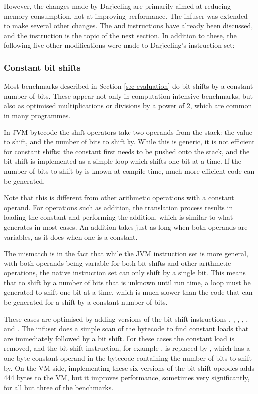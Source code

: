 However, the changes made by Darjeeling are primarily aimed at reducing memory consumption, not at improving performance. The infuser was extended to make several other changes. The  and  instructions have already been discussed, and the  instruction is the topic of the next section. In addition to these, the following five other modifications were made to Darjeeling's instruction set:

\subsubsection{Constant bit shifts}
\label{sec-opt-constant-shift}


Most benchmarks described in Section \ref{sec-evaluation} do bit shifts by a constant number of bits. These appear not only in computation intensive benchmarks, but also as optimised multiplications or divisions by a power of 2, which are common in many programmes.

In JVM bytecode the shift operators take two operands from the stack: the value to shift, and the number of bits to shift by. While this is generic, it is not efficient for constant shifts: the constant first needs to be pushed onto the stack, and the bit shift is implemented as a simple loop which shifts one bit at a time. If the number of bits to shift by is known at compile time, much more efficient code can be generated.

Note that this is different from other arithmetic operations with a constant operand. For operations such as addition, the translation process results in loading the constant and performing the addition, which is similar to what  generates in most cases. An addition takes just as long when both operands are variables, as it does when one is a constant. 

The mismatch is in the fact that while the JVM instruction set is more general, with both operands being variable for both bit shifts and other arithmetic operations, the native instruction set can only shift by a single bit. This means that to shift by a number of bits that is unknown until run time, a loop must be generated to shift one bit at a time, which is much slower than the code that can be generated for a shift by a constant number of bits.

These cases are optimised by adding  versions of the bit shift instructions , , , , , and . The infuser does a simple scan of the bytecode to find constant loads that are immediately followed by a bit shift. For these cases the constant load is removed, and the bit shift instruction, for example , is replaced by , which has a one byte constant operand in the bytecode containing the number of bits to shift by. On the VM side, implementing these six  versions of the bit shift opcodes adds 444 bytes to the VM, but it improves performance, sometimes very significantly, for all but three of the benchmarks.

